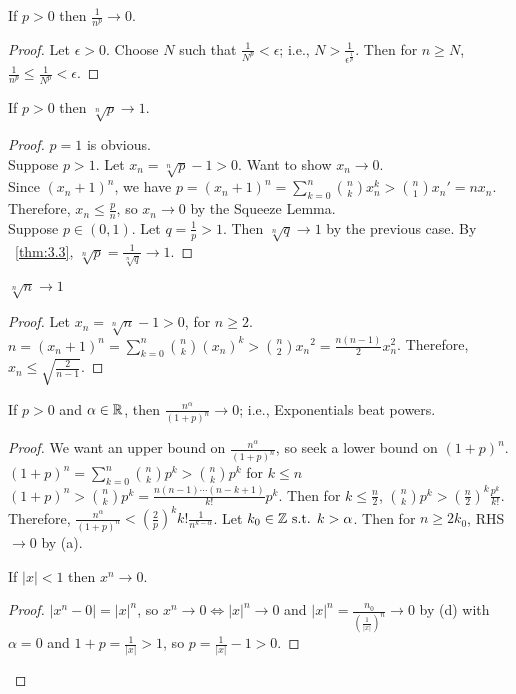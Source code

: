 \begin{thm}[20]
	\begin{enumerate}[label=(\alph*)]
		\item If $p>0$ then $\frac{1}{n^{p}} \to 0$.
		      \begin{proof}
			      Let $\epsilon>0$. Choose $N$ such that $\frac{1}{N^{p}} <\epsilon$; i.e., $N>\frac{1}{\epsilon^{\frac{1}{p}}}$. Then for $n\ge N$, $\frac{1}{n^{p}}  \le \frac{1}{N^{p}} <\epsilon$.
		      \end{proof}
		\item If $p>0$ then $\sqrt[n]{p} \to 1$.
		      \begin{proof}
			      $p=1$ is obvious.\\
			      Suppose $p>1$. Let $x_n=\sqrt[n]{p} -1>0$.
			      Want to show $x_n \to 0$.\\
			      Since $(x_n +1)^{n}$, we have $p=(x_n+1)^{n}=\sum_{k=0}^{n}{\binom{n}{k}x_n ^{k}>\binom{n}{1} x_n'=nx_n}$. Therefore, $x_n \le  \frac{p}{n}$, so $x_n \to 0$ by the Squeeze Lemma.
			      \\
			      Suppose $p \in (0,1)$. Let $q=\frac{1}{p}>1$. Then $\sqrt[n]{q} \to 1$ by the previous case. By ~\ref{thm:3.3}, $\sqrt[n]{p} = \frac{1}{\sqrt[n]{q}} \to 1$.
		      \end{proof}
		\item $\sqrt[n]{n}\to 1$
		      \begin{proof}
			      Let $x_n=\sqrt[n]{n}-1>0$, for $n\ge 2$.
			      $n=(x_n+1)^{n}=\sum_{k=0}^{n}{\binom{n}{k}(x_n)^{k}}>\binom{n}{2}{x_n}^{2}=\frac{n(n-1)}{2} x_n ^2$. Therefore, $x_n \le \sqrt{\frac{2}{n-1}}$.
		      \end{proof}
		\item If $p>0$ and $\alpha \in \mathbb{R}$, then $\frac{n^{\alpha}}{(1+p)^{n}}\to 0$; i.e., Exponentials beat powers.
		      \begin{proof}
			      We want an upper bound on $\frac{n^{\alpha}}{(1+p)^{n}}$, so seek a lower bound on $(1+p)^{n}$.\\
			      $(1+p)^{n}=\sum_{k=0}^{n}\binom{n}{k}p^{k}>\binom{n}{k}p^{k}$ for $k\le n$\\
			      $(1+p)^{n}>\binom{n}{k}p^{k}=\frac{n(n-1) \cdots (n-k+1)}{k!}p^{k}$.
			      Then for $k \le \frac{n}{2}$,  $\binom{n}{k}p^{k} > (\frac{n}{2})^{k}\frac{p^{k}}{k!}$.
			      Therefore, $\frac{n^{\alpha}}{(1+p)^{n}}<(\frac{2}{p})^{k} k! \frac{1}{n^{k-\alpha}}$. Let $k_0 \in \mathbb{Z} \text{ s.t. } k>\alpha$. Then for $n\ge 2 k_0$, RHS $\to 0$ by (a).
			      \item If $|x| <1 $ then $x^{n}\to 0$.
			      \begin{proof}
				      $|x^{n}-0| = |x|^{n}$, so $x^{n}\to 0 \Leftrightarrow |x|^{n}\to 0$ and $|x|^{n}=\frac{n_0}{(\frac{1}{|x|})^{n}}\to 0$ by (d) with $\alpha=0$ and $1+p=\frac{1}{|x|}>1$, so $p=\frac{1}{|x|}-1>0$.
			      \end{proof}
		      \end{proof}
	\end{enumerate}
\end{thm}

